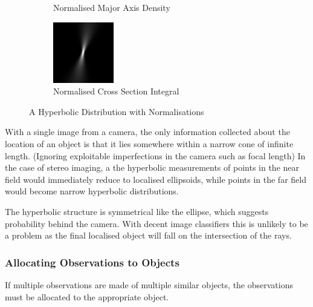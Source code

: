 \documentclass[a4paper, 11pt, titlepage]{article}
\begin{document}
\begin{figure}
\begin{subfigure}{.33\textwidth}
        \caption{Normalised Major Axis Density}
        \label{fig:hyperbolicsub2}
      \end{subfigure}
      \begin{subfigure}{.33\textwidth}
        \centering
        \includegraphics[width=.9\linewidth]{images/GaussianRay2.png}
        \caption{Normalised Cross Section Integral}
        \label{fig:hyperbolicsub3}
      \end{subfigure}
      \caption{A Hyperbolic Distribution with Normalisations}
      \label{fig:hyperbolic}
      \end{figure}
      With a single image from a camera, the only information collected about the location of an object is that it lies somewhere within a narrow cone of infinite length.  (Ignoring exploitable imperfections in the camera such as focal length)
      In the case of stereo imaging, a the hyperbolic measurements of points in the near field would immediately reduce to localised ellipsoids, while points in the far field would become narrow hyperbolic distributions.

      The hyperbolic structure is symmetrical like the ellipse, which suggests probability behind the camera.  With decent image classifiers this is unlikely to be a problem as the final localised object will fall on the intersection of the rays.

    \subsubsection{Allocating Observations to Objects}
      If multiple observations are made of multiple similar objects, the observations must be allocated to the appropriate object.
\end{document}
